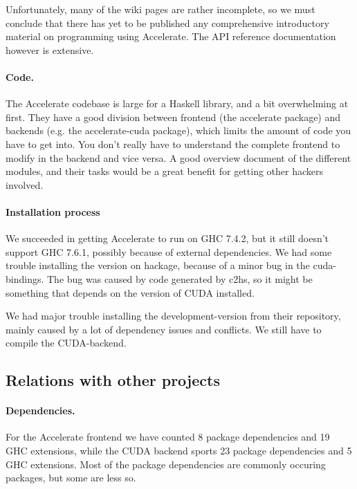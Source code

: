 Unfortunately, many of the wiki pages are rather incomplete, so we must
conclude that there has yet to be published any comprehensive introductory
material on programming using Accelerate.
The API reference documentation however is extensive.

\paragraph{Code.} The Accelerate codebase is large for a Haskell library, and
a bit overwhelming at first. They have a good division between frontend (the
accelerate package) and backends (e.g. the accelerate-cuda package), which
limits the amount of code you have to get into. You don't really have to
understand the complete frontend to modify in the backend and vice versa. A
good overview document of the different modules, and their tasks would be a
great benefit for getting other hackers involved.

\paragraph{Installation process} We succeeded in getting Accelerate to run on
GHC 7.4.2, but it still doesn't support GHC 7.6.1, possibly because of external
dependencies.  We had some trouble installing the version on hackage, because
of a minor bug in the cuda-bindings. The bug was caused by code generated by
c2hs, so it might be something that depends on the version of CUDA installed.

We had major trouble installing the development-version from their repository,
mainly caused by a lot of dependency issues and conflicts. We still have to
compile the CUDA-backend.  

\subsection{Relations with other projects}

\paragraph{Dependencies.}
For the Accelerate frontend we have counted 8 package dependencies and 19 GHC
extensions, while the CUDA backend sports 23 package dependencies and 5 GHC
extensions.
Most of the package dependencies are commonly occuring packages, but some are
less so. 

